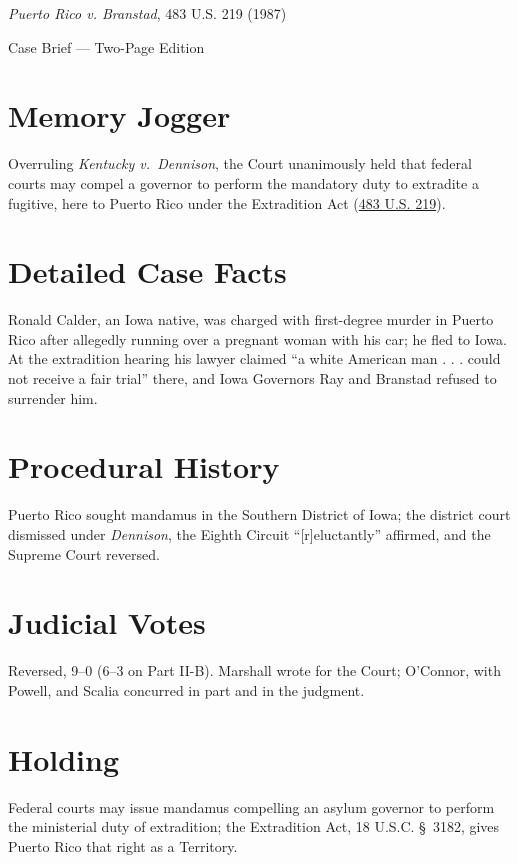 \documentclass[12pt]{article}
\begin{document}
\begin{center}
{\LARGE \textit{Puerto Rico v. Branstad}, 483 U.S. 219 (1987)\par}
\vspace{0.5em}
{\large Case Brief --- Two-Page Edition\par}
\end{center}

\section{Memory Jogger}
Overruling \textit{Kentucky v.\ Dennison}, the Court unanimously held that federal courts may compel a governor to perform the mandatory duty to extradite a fugitive, here to Puerto Rico under the Extradition Act (\href{https://supreme.justia.com/cases/federal/us/483/219/}{483 U.S. 219}).

\section{Detailed Case Facts}
Ronald Calder, an Iowa native, was charged with first-degree murder in Puerto Rico after allegedly running over a pregnant woman with his car; he fled to Iowa. At the extradition hearing his lawyer claimed ``a white American man . . . could not receive a fair trial'' there, and Iowa Governors Ray and Branstad refused to surrender him.

\section{Procedural History}
Puerto Rico sought mandamus in the Southern District of Iowa; the district court dismissed under \textit{Dennison}, the Eighth Circuit ``[r]eluctantly'' affirmed, and the Supreme Court reversed.

\section{Judicial Votes}
Reversed, 9--0 (6--3 on Part II-B). Marshall wrote for the Court; O'Connor, with Powell, and Scalia concurred in part and in the judgment.

\section{Holding}
Federal courts may issue mandamus compelling an asylum governor to perform the ministerial duty of extradition; the Extradition Act, 18 U.S.C. \S~3182, gives Puerto Rico that right as a Territory.
\end{document}
